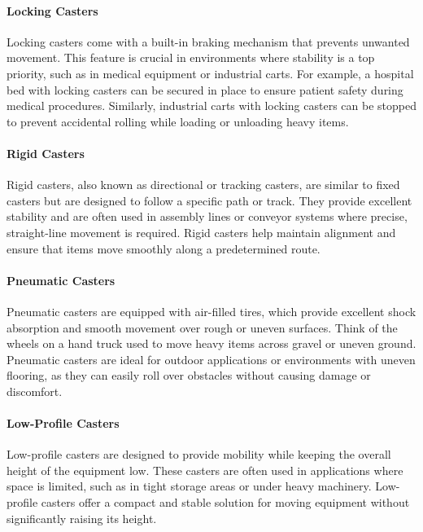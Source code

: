 \documentclass[../../main]{subfiles}
\begin{document}
\paragraph{Locking Casters}
Locking casters come with a built-in braking mechanism that prevents unwanted movement. This feature is crucial in environments where stability is a top priority, such as in medical equipment or industrial carts. For example, a hospital bed with locking casters can be secured in place to ensure patient safety during medical procedures. Similarly, industrial carts with locking casters can be stopped to prevent accidental rolling while loading or unloading heavy items.

\paragraph{Rigid Casters}
Rigid casters, also known as directional or tracking casters, are similar to fixed casters but are designed to follow a specific path or track. They provide excellent stability and are often used in assembly lines or conveyor systems where precise, straight-line movement is required. Rigid casters help maintain alignment and ensure that items move smoothly along a predetermined route.

\paragraph{Pneumatic Casters}
Pneumatic casters are equipped with air-filled tires, which provide excellent shock absorption and smooth movement over rough or uneven surfaces. Think of the wheels on a hand truck used to move heavy items across gravel or uneven ground. Pneumatic casters are ideal for outdoor applications or environments with uneven flooring, as they can easily roll over obstacles without causing damage or discomfort.

\paragraph{Low-Profile Casters}
Low-profile casters are designed to provide mobility while keeping the overall height of the equipment low. These casters are often used in applications where space is limited, such as in tight storage areas or under heavy machinery. Low-profile casters offer a compact and stable solution for moving equipment without significantly raising its height.
\end{document}
